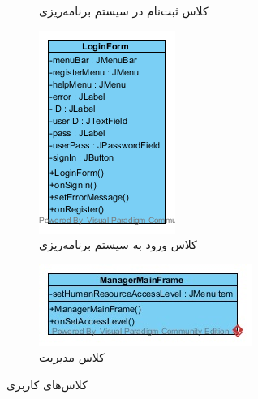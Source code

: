 \begin{figure}[H]
\begin{subfigure}[b]{0.3\textwidth}
		\caption{کلاس ثبت‌نام در سیستم برنامه‌ریزی}
	\end{subfigure}
	\begin{subfigure}[b]{0.3\textwidth}
		\includegraphics[width=\textwidth]{img/class-design/ui/LoginForm.png}
		\caption{کلاس ورود به سیستم برنامه‌ریزی}
	\end{subfigure}
	\begin{subfigure}[b]{0.3\textwidth}
		\includegraphics[width=\textwidth]{img/class-design/ui/ManagerMainFrame.jpg}
		\caption{کلاس مدیریت}
	\end{subfigure}
	\caption{کلاس‌های کاربری}
\end{figure}

